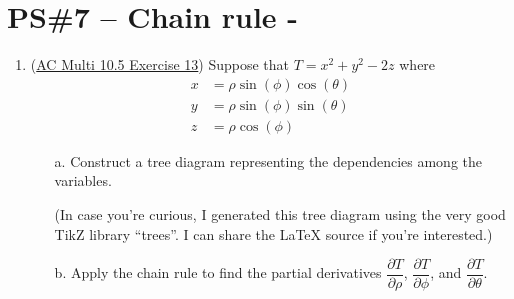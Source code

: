 


%


\allowdisplaybreaks
\section{PS\#7 -- Chain rule -  }

\begin{enumerate}[leftmargin=0pt]
    
    \item (\href{https://activecalculus.org/multi/S-10-5-Chain-Rule.html#S-10-5-Chain-Rule-7-13}{AC Multi 10.5 Exercise 13}) Suppose that $T = x^2 + y^2 - 2z$ where
    \begin{align*}
    x &= \rho\sin(\phi)\cos(\theta)\\
    y &= \rho\sin(\phi)\sin(\theta)\\
    z &= \rho\cos(\phi)
    \end{align*}
    \begin{enumerate}
        \item[a.] Construct a tree diagram representing the dependencies among the variables.
        
        \begin{red}
        \begin{center}
        \end{center}
        (In case you're curious, I generated this tree diagram using the very good TikZ library ``trees''. I can share the LaTeX source if you're interested.)
        \end{red}
        
        
        \item[b.] Apply the chain rule to find the partial derivatives $\dfrac{\partial T}{\partial\rho}$, $\dfrac{\partial T}{\partial\phi}$, and $\dfrac{\partial T}{\partial\theta}$.
        

\end{enumerate}
\end{enumerate}

